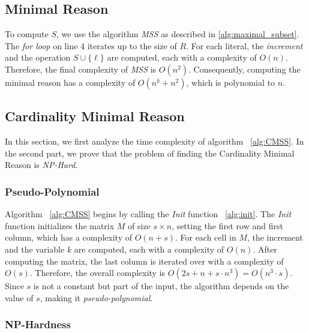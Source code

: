 \subsection{Minimal Reason}
To compute $S$, we use the algorithm \textit{MSS} as described in \eqref{alg:maximal_subset}. 
The \textit{for loop} on line 4 iterates up to the size of $R$. For each literal, 
the \textit{increment} and the operation $S \cup \{\ell\}$ are computed, each with a complexity of $O(n)$. 
Therefore, the final complexity of \textit{MSS} is $O(n^2)$. Consequently, computing the minimal reason has 
a complexity of $O(n^k + n^2)$, which is polynomial to $n$.

\subsection{Cardinality Minimal Reason}
In this section, we first analyze the time complexity of algorithm ~\ref{alg:CMSS}. 
In the second part, we prove that the problem of finding the Cardinality Minimal Reason is \textit{NP-Hard}.

\subsubsection{Pseudo-Polynomial}

Algorithm ~\ref{alg:CMSS} begins by calling the \textit{Init} 
function ~\eqref{alg:init}. The \textit{Init} function initializes the matrix 
$M$ of size $s \times n$, setting the first row and first column, which has 
a complexity of $O(n + s)$. For each cell in $M$, the increment and the variable $k$ are computed, 
each with a complexity of $O(n)$. After computing the matrix, the last column is iterated over 
with a complexity of $O(s)$. Therefore, the overall 
complexity is $O(2s + n + s \cdot n^3) = O(n^3 \cdot s)$. 
Since $s$ is not a constant but part of the input, the algorithm depends on 
the value of $s$, making it \textit{pseudo-polynomial}.

\subsubsection{NP-Hardness}
\label{subsubsection:hardness}

